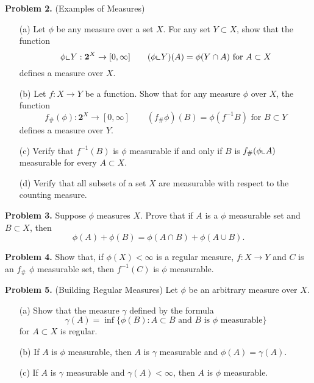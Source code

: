 \documentclass[10pt]{article}
\begin{document}
	\newpage 
	\noindent \textbf{Problem 2.} (Examples of Measures) ~
		\begin{itemize}
			\item[(a)] Let $\phi$ be any measure over a set $X$. For any set $Y \subset X$, show that the function $$\phi \mathlarger\llcorner Y : \mathbf{2}^X \to [0, \infty] \qquad (\phi \mathlarger \llcorner Y)(A) = \phi(Y \cap A) \text{ for } A \subset X$$ defines a measure over $X$. 
			
			\item[(b)] Let $f: X \to Y$ be a function. Show that for any measure $\phi$ over $X$, the function $$f_{\#}(\phi): \mathbf{2}^X \to [0, \infty] \qquad (f_{\#} \phi)(B) = \phi(f^{-1}B) \text{ for } B \subset Y$$ defines a measure over $Y$. 
			
			\item[(c)] Verify that $f^{-1}(B)$ is $\phi$ measurable if and only if $B$ is $f_{\#}(\phi \mathlarger \llcorner A)$ measurable for every $A \subset X$. 
			
			\item[(d)] Verify that all subsets of a set $X$ are measurable with respect to the counting measure. 
		\end{itemize}
	
	\vspace{20pt}
	
	\noindent \textbf{Problem 3.} Suppose $\phi$ measures $X$. Prove that if $A$ is a $\phi$ measurable set and $B \subset X$, then $$\phi(A) + \phi(B) = \phi(A \cap B) + \phi(A \cup B).$$
	
	\vspace{20pt}
	
	\noindent \textbf{Problem 4.} Show that, if $\phi(X) < \infty$ is a regular measure, $f: X \to Y$ and $C$ is an $f_{\#}$ $\phi$ measurable set, then $f^{-1}(C)$ is $\phi$ measurable.
	
	\vspace{20pt}
	
	\noindent \textbf{Problem 5.} (Building Regular Measures) Let $\phi$ be an arbitrary measure over $X$. 
		\begin{itemize}
			\item[(a)] Show that the measure $\gamma$ defined by the formula $$\gamma(A) = \inf \{\phi(B) : A \subset B \text{ and } B \text{ is } \phi \text{ measurable}\}$$ for $A \subset X$ is regular. 
			
			\item[(b)] If $A$ is $\phi$ measurable, then $A$ is $\gamma$ measurable and $\phi(A) = \gamma(A)$.
			
			\item[(c)] If $A $ is $\gamma$ measurable and $\gamma(A) < \infty$, then $A$ is $\phi$ measurable.
		\end{itemize}
	
\end{document}
